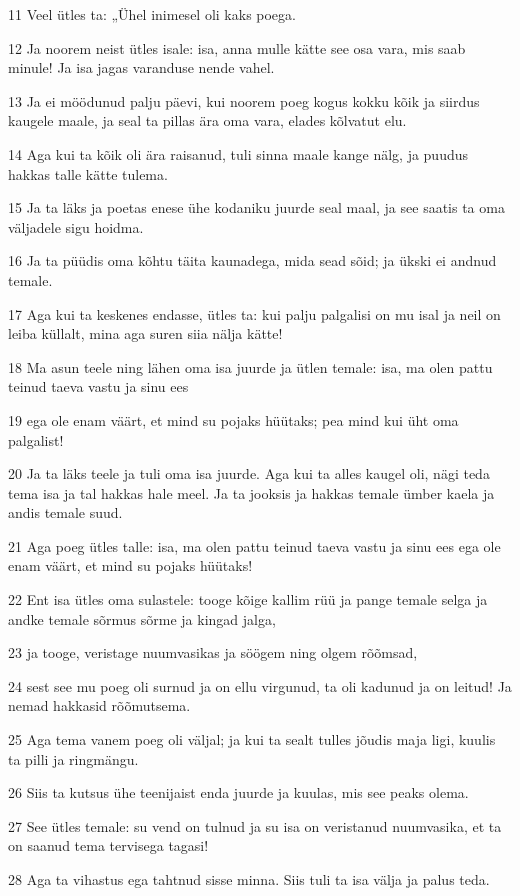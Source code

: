 \par 11 Veel ütles ta: „Ühel inimesel oli kaks poega.
\par 12 Ja noorem neist ütles isale: isa, anna mulle kätte see osa vara, mis saab minule! Ja isa jagas varanduse nende vahel.
\par 13 Ja ei möödunud palju päevi, kui noorem poeg kogus kokku kõik ja siirdus kaugele maale, ja seal ta pillas ära oma vara, elades kõlvatut elu.
\par 14 Aga kui ta kõik oli ära raisanud, tuli sinna maale kange nälg, ja puudus hakkas talle kätte tulema.
\par 15 Ja ta läks ja poetas enese ühe kodaniku juurde seal maal, ja see saatis ta oma väljadele sigu hoidma.
\par 16 Ja ta püüdis oma kõhtu täita kaunadega, mida sead sõid; ja ükski ei andnud temale.
\par 17 Aga kui ta keskenes endasse, ütles ta: kui palju palgalisi on mu isal ja neil on leiba küllalt, mina aga suren siia nälja kätte!
\par 18 Ma asun teele ning lähen oma isa juurde ja ütlen temale: isa, ma olen pattu teinud taeva vastu ja sinu ees
\par 19 ega ole enam väärt, et mind su pojaks hüütaks; pea mind kui üht oma palgalist!
\par 20 Ja ta läks teele ja tuli oma isa juurde. Aga kui ta alles kaugel oli, nägi teda tema isa ja tal hakkas hale meel. Ja ta jooksis ja hakkas temale ümber kaela ja andis temale suud.
\par 21 Aga poeg ütles talle: isa, ma olen pattu teinud taeva vastu ja sinu ees ega ole enam väärt, et mind su pojaks hüütaks!
\par 22 Ent isa ütles oma sulastele: tooge kõige kallim rüü ja pange temale selga ja andke temale sõrmus sõrme ja kingad jalga,
\par 23 ja tooge, veristage nuumvasikas ja söögem ning olgem rõõmsad,
\par 24 sest see mu poeg oli surnud ja on ellu virgunud, ta oli kadunud ja on leitud! Ja nemad hakkasid rõõmutsema.
\par 25 Aga tema vanem poeg oli väljal; ja kui ta sealt tulles jõudis maja ligi, kuulis ta pilli ja ringmängu.
\par 26 Siis ta kutsus ühe teenijaist enda juurde ja kuulas, mis see peaks olema.
\par 27 See ütles temale: su vend on tulnud ja su isa on veristanud nuumvasika, et ta on saanud tema tervisega tagasi!
\par 28 Aga ta vihastus ega tahtnud sisse minna. Siis tuli ta isa välja ja palus teda.
